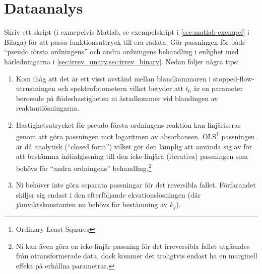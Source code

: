 \section{Dataanalys}
\label{sec:analys}
Skriv ett skript (i exmepelvis Matlab, se exempelskript i
\cref{sec:matlab-exempel} i Bilaga) för att passa funktionsuttryck 
till era rådata. Gör passningen för både ``pseudo första ordningens''
och andra ordningens behandling i enlighet med härledningarna i
\cref{sec:irrev_unary,sec:irrev_binary}. Nedan följer några tips:

\begin{enumerate}
\item Kom ihåg att det är ett visst
  avstånd mellan blandkammaren i stopped-flow-utrustningen och
  spektrofotometern vilket betyder att $t_0$ är en parameter beroende på
  flödeshastigheten ni åstadkommer vid blandingen av reaktantlösningarna.
\item Hastighetsutrycket för pseudo första ordningens reaktion kan
  linjäriseras genom att göra passningen mot logaritmen av
  absorbansen. OLS\footnote{Ordinary Least Squares} passningen är
  då analytisk (``closed form'') vilket gör den lämplig att använda sig av för
  att bestämma initialgissning till den icke-linjära (iterativa)
  passningen som behövs för ``andra ordningens'' behandling.\footnote{
  Ni kan även göra en icke-linjär passning för det irreversibla fallet
  utgåendes från otransformerade data, dock kommer det troligtvis endast
  ha en marginell effekt på erhållna parametrar.}
\item Ni behöver inte göra separata passningar för det reversibla
  fallet. Förfarandet skiljer sig endast i den efterföljande
  ekvationslösningen (där jämviktskonstanten nu behövs för bestämning av
  $k_f$).
\end{enumerate}

